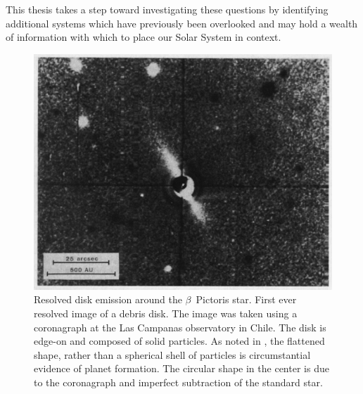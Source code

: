     This thesis takes a step toward investigating these questions by identifying additional systems which have previously been overlooked and may hold a wealth of information with which to place our Solar System in context. 
    
    \begin{figure}
    \centering
    \includegraphics[width=.6\textwidth]{Ch1/betapic_SmithTerrile_84} 
    \caption[First Resolved Debris Disk: $\beta$~Pictoris]{Resolved disk emission around the $\beta$~Pictoris star. First ever resolved image of a debris disk. The image was taken using a coronagraph at the Las Campanas observatory in Chile. The disk is edge-on and composed of solid particles. As noted in \citet{Smith1984}, the flattened shape, rather than a spherical shell of particles is circumstantial evidence of planet formation. The circular shape in the center is due to the coronagraph and imperfect subtraction of the standard star.}
    \label{fig:smith_terrile_betapic}
    \end{figure}
    
    
